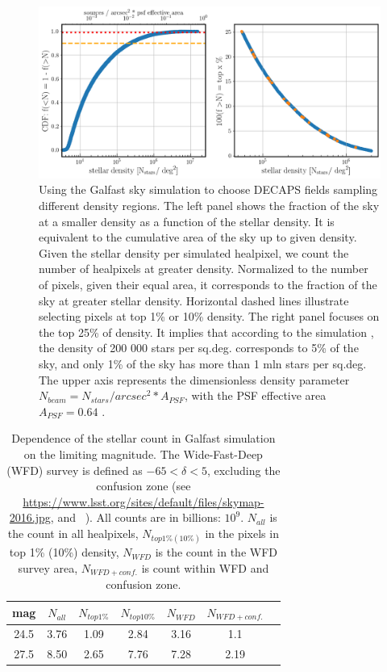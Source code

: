 \documentclass[DM,lsstdraft,toc,usenatbib]{lsstdoc}
\begin{document}
\begin{figure}
\centering
\includegraphics[width=0.95\columnwidth]{figs/MAF_density_definitions.png}
\vskip -0.15in
\caption{Using the Galfast sky simulation to choose DECAPS fields sampling different density regions.  The left panel shows the fraction of the sky at a smaller density  as a function of  the stellar density.  It is equivalent to the cumulative area of the sky up to given density. Given the stellar density per simulated healpixel, we count the number of healpixels at greater density. Normalized to the number of pixels, given their equal area, it corresponds to the fraction of the sky at greater stellar density. Horizontal dashed lines illustrate selecting pixels at top 1\% or 10\% density. The right panel focuses on the top 25\% of density.  It implies that according to the simulation , the density of 200 000 stars per sq.deg. corresponds to 5\% of the sky, and only  1\% of the sky has more than 1 mln stars per sq.deg. The upper axis represents the dimensionless density parameter $N_{beam} = N_{stars}/{arcsec}^{2} * A_{PSF}$, with the PSF effective area $A_{PSF} = 0.64$ \arcsec.}
\label{fig:illustrate_density}
\end{figure} 

\begin{table}
\centering
\caption{Dependence of the stellar count in Galfast simulation  on the limiting magnitude. The Wide-Fast-Deep (WFD) survey is defined as $-65 < \delta < 5$, excluding the confusion zone (see \url{https://www.lsst.org/sites/default/files/skymap-2016.jpg}, and ~\cite{awan2016}). All counts are in billions:  $10^{9}$. $N_{all}$ is the count in all healpixels, $N_{top 1\% (10\%)}$ in the pixels in top 1\% (10\%) density, $N_{WFD}$ is the count in the WFD survey area,  $N_{WFD+conf.}$ is count within WFD and confusion zone. }
\label{tab:galfast_counts}
\begin{tabular}{ ccccccc} 
\hline
mag & $N_{all}$ &  $N_{top 1\%}$ & $N_{top 10\%}$ & $N_{WFD}$ & $N_{WFD+conf.}$ \\ 
\hline
24.5  & 3.76    & 1.09  &  2.84 &  3.16 & 1.1  \\ 
27.5  & 8.50    & 2.65  &  7.76 &  7.28 & 2.19 \\ 
\hline
\end{tabular}
\end{table}
\end{document}
